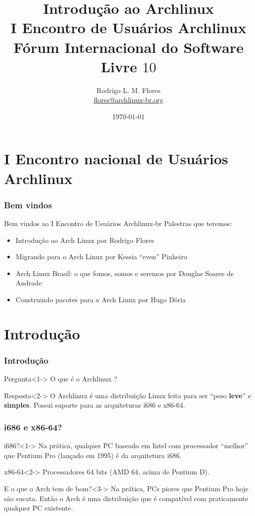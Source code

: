 \documentclass{beamer}
\title{Introdução ao Archlinux\\I Encontro de Usuários Archlinux\\Fórum Internacional do Software Livre $10$}
\author{Rodrigo L. M. Flores \\ \url{flores@archlinux-br.org}}
\institute{Projeto Archlinux-BR}
\begin{document}
\date{\today}

\frame{\titlepage}
\section{I Encontro nacional de Usuários Archlinux}


\begin{frame}
    \frametitle{Bem vindos}
    \begin{block}{Bem vindos ao I Encontro de Usuários Archlinux-br}
        Palestras que teremos:
        \begin{itemize}
            \item<1-> Introdução ao Arch Linux por Rodrigo Flores
            \item<2-> Migrando para o Arch Linux por Kessia ``even'' Pinheiro
            \item<3-> Arch Linux Brasil: o que fomos, somos e seremos por Douglas Soares de Andrade
            \item<4-> Construindo pacotes para o Arch Linux por Hugo Dória
        \end{itemize}
    \end{block}
\end{frame}

\section{Introdução}


\begin{frame}
    \frametitle{Introdução}
    \begin{block}{Pergunta}<1->
        O que é o Archlinux ?
    \end{block}
    \begin{block}{Resposta}<2->
            O Archlinux é uma distribuição Linux feita para ser ``peso \textbf{leve}'' e \textbf{simples}. Possui suporte para as arquiteturas i686 e x86-64. 
    \end{block}
    
\end{frame}

\begin{frame}
    \frametitle{i686 e x86-64?}
    \begin{block}{i686?}<1->
        Na prática, qualquer PC baseado em Intel com processador ``melhor'' que Pentium Pro (lançado em 1995) é da arquitetura i686. 
    \end{block}
    \begin{block}{x86-64}<2->
        Processadores $64$ bits (AMD $64$, acima de Pentium D). 
    \end{block}
    \begin{block}{E o que o Arch tem de bom?}<3->
        Na prática, PCs piores que Pentium Pro hoje são sucata. Então o Arch é uma distribuição que é compatível com praticamente qualquer PC existente.
    \end{block}

\end{frame}
\end{document}
